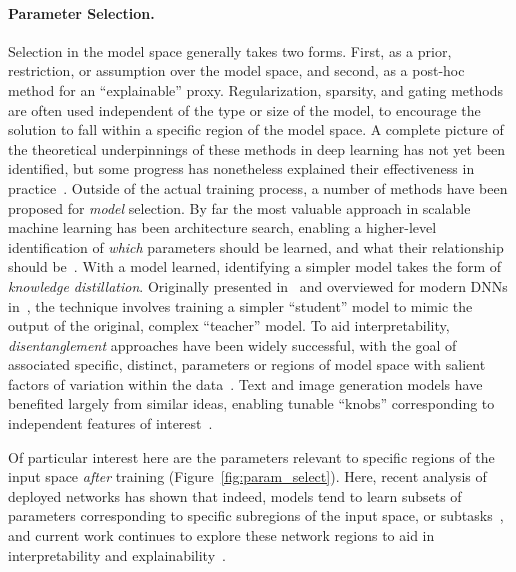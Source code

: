 \paragraph{Parameter Selection.} 
Selection in the model space generally takes two forms. First, as a prior, restriction, or assumption over the model space, and second, as a post-hoc method for an ``explainable'' proxy.
Regularization, sparsity, and gating methods are often used independent of the type or size of the model, to encourage the solution to fall within a specific region of the model space.
A complete picture of the theoretical underpinnings of these methods in deep learning has not yet been identified, but some progress has nonetheless explained their effectiveness in practice~\citep{hardt2016train,jacot2018neural,neyshabur2014search}.
Outside of the actual training process,
a number of methods have been proposed for \textit{model} selection.
By far the most valuable approach in scalable machine learning has been architecture search, enabling a higher-level identification of \textit{which} parameters should be learned, and what their relationship should be~\citep{elsken2019neural}.
With a model learned, identifying a simpler model takes the form of \textit{knowledge distillation}.
Originally presented in~\cite{hintondistill} and overviewed for modern DNNs in~\cite{gou2021knowledge}, the technique involves training a simpler ``student'' model to mimic the output of the original, complex ``teacher'' model.
To aid interpretability, \textit{disentanglement} approaches have been widely successful,
with the goal of associated specific, distinct, parameters or regions of model space with salient factors of variation within the data~\citep{creager2019flexibly,locatello2019challenging}.
Text and image generation models have benefited largely from similar ideas, enabling tunable ``knobs'' corresponding to independent features of interest~\citep{higgins2017betavae,karras2019style,hjelm2018learning}.

Of particular interest here are the parameters relevant to specific regions of the input space \textit{after} training (Figure~\ref{fig:param_select}). 
Here, recent analysis of deployed networks has shown that indeed, models tend to learn subsets of parameters corresponding to specific subregions of the input space, or subtasks~\citep{bau2017network,fong2018net2vec}, and current work continues to explore these network regions to aid in interpretability and explainability~\citep{netdissect,yiyou}.



